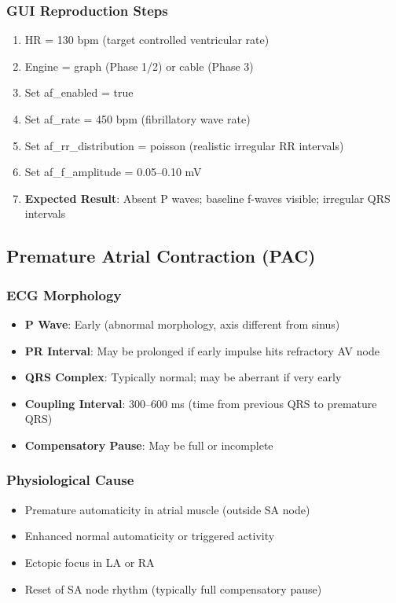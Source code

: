 \documentclass[11pt, a4paper]{article}
\begin{document}
\subsubsection{GUI Reproduction Steps}
\begin{enumerate}
    \item HR = 130 bpm (target controlled ventricular rate)
    \item Engine = graph (Phase 1/2) or cable (Phase 3)
    \item Set af\_enabled = true
    \item Set af\_rate = 450 bpm (fibrillatory wave rate)
    \item Set af\_rr\_distribution = poisson (realistic irregular RR intervals)
    \item Set af\_f\_amplitude = 0.05--0.10 mV
    \item \textbf{Expected Result}: Absent P waves; baseline f-waves visible; irregular QRS intervals
\end{enumerate}

\subsection{Premature Atrial Contraction (PAC)}

\subsubsection{ECG Morphology}
\begin{itemize}
    \item \textbf{P Wave}: Early (abnormal morphology, axis different from sinus)
    \item \textbf{PR Interval}: May be prolonged if early impulse hits refractory AV node
    \item \textbf{QRS Complex}: Typically normal; may be aberrant if very early
    \item \textbf{Coupling Interval}: 300--600 ms (time from previous QRS to premature QRS)
    \item \textbf{Compensatory Pause}: May be full or incomplete
\end{itemize}

\subsubsection{Physiological Cause}
\begin{itemize}
    \item Premature automaticity in atrial muscle (outside SA node)
    \item Enhanced normal automaticity or triggered activity
    \item Ectopic focus in LA or RA
    \item Reset of SA node rhythm (typically full compensatory pause)
\end{itemize}
\end{document}

